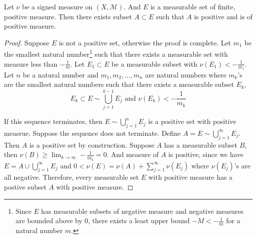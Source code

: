 \begin{lemma}[Hahn]
	Let $\nu$ be a signed measure on $(X,\mathcal{M})$.
	And $E$ is a measurable set of finite, positive measure.
	Then there exists subset $A \subset E$ such that $A$ is positive and is of positive measure.
\end{lemma}
\begin{proof}
	Suppose $E$ is not a positive set, otherwise the proof is complete.
	Let $m_1$ be the smallest natural number\dag\footnote{
		Since $E$ has measurable subsets of negative measure and negative measures are bounded above by $0$, there exists a least upper bound $-M < -\frac{1}{m}$ for a natural number $m$.}
	such that there exists a measurable set with measure less than $-\frac{1}{m}$.
	Let $E_1 \subset E$ be a measurable subset with $\nu(E_1) < -\frac{1}{m_1}$.\\

	Let $n$ be a natural number and  $m_1,m_2,\dots,m_n$ are natural numbers where $m_k$'s are the smallest natural numbers such that there exists a measurable subset $E_k$,
	\[ E_k \subset E \sim \bigcup_{j=1}^{k-1} E_j \text{ and }\nu(E_k) < -\frac{1}{m_k} \]

	If this sequence terminates, then $\displaystyle E \sim \bigcup_{j=1}^n E_j$ is a positive set with positive measrue.
	Suppose the sequence does not terminate.
	Define $\displaystyle A = E \sim \bigcup_{j=1}^\infty E_j$.
	Then $A$ is a positive set by construction.
	Suppose $A$ has a measurable subset $B$, then $\displaystyle \nu(B) \ge \lim_{k \to \infty} -\frac{1}{m_k} = 0$.
	And measure of $A$ is positive, since we have $\displaystyle E = A \cup \bigcup_{j=1}^\infty E_j$ and $\displaystyle 0 < \nu(E) = \nu(A) + \sum_{j=1}^\infty \nu(E_j)$ where $\nu(E_j)$'s are all negative.
	Therefore, every measurable set $E$ with positive measure has a postive subset $A$ with positive measure.
\end{proof}

